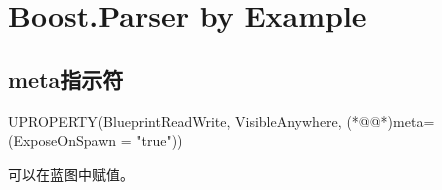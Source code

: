 \documentclass[9pt,openright,oneside]{MyBook}
\begin{document}
\frontmatter


\mainmatter

 

\chapter{Boost.Parser by Example}


\section{meta指示符}
\begin{code}
UPROPERTY(BlueprintReadWrite, VisibleAnywhere, (*@@*)meta=(ExposeOnSpawn = "true"))
\end{code}
可以在蓝图中赋值。
\end{document}

